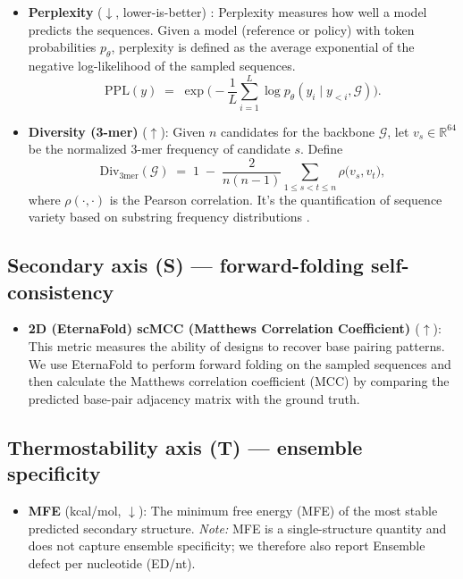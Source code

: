 {\begin{itemize}[leftmargin=1.2em,itemsep=2pt,topsep=2pt]
\item \textbf{Perplexity} ($\downarrow$, lower-is-better) \citep{bengioaneural}: Perplexity measures how well a model predicts the sequences. Given a model (reference or policy) with token probabilities $p_\theta$, perplexity is defined as the average exponential of the negative log-likelihood of the sampled sequences.
$$\mathrm{PPL}(y) \;=\; \exp\!\Big(-\frac{1}{L} \sum_{i=1}^{L} \log p_\theta(y_i \mid y_{<i}, \mathcal{G})\Big).$$

\item \textbf{Diversity (3-mer)} ($\uparrow$): Given $n$ candidates for the backbone $\mathcal{G}$, let $v_s \in \mathbb{R}^{64}$ be the normalized 3-mer frequency of candidate $s$. Define
$$\mathrm{Div}_{3\mathrm{mer}}(\mathcal{G}) \;=\; 1 \;-\; \frac{2}{n(n-1)} \sum_{1 \le s < t \le n} \rho\!\big(v_s, v_t\big),$$
where $\rho(\cdot,\cdot)$ is the Pearson correlation. It's the quantification of sequence variety based on substring frequency distributions \citep{shannon1948mathematical, Bokulich2024diversitykmer}.
\end{itemize}

\subsection*{Secondary axis (S) — forward-folding self-consistency}
\begin{itemize}[leftmargin=1.2em,itemsep=2pt,topsep=2pt]
\item \textbf{2D (EternaFold) scMCC (Matthews Correlation Coefficient) \citep{matthews1975comparison}} ($\uparrow$): This metric measures the ability of designs to recover base pairing patterns. We use EternaFold \citep{waymentsteele2022eternafold} to perform forward folding on the sampled sequences and then calculate the Matthews correlation coefficient (MCC) by comparing the predicted base-pair adjacency matrix with the ground truth.
\end{itemize}

\subsection*{Thermostability axis (T) — ensemble specificity}
\begin{itemize}[leftmargin=1.2em,itemsep=2pt,topsep=2pt]
\item \textbf{MFE} (kcal/mol, $\downarrow$): The minimum free energy (MFE) of the most stable predicted secondary structure. \emph{Note:} MFE is a single-structure quantity and does not capture ensemble specificity; we therefore also report Ensemble defect per nucleotide (ED/nt).


\end{itemize}}
